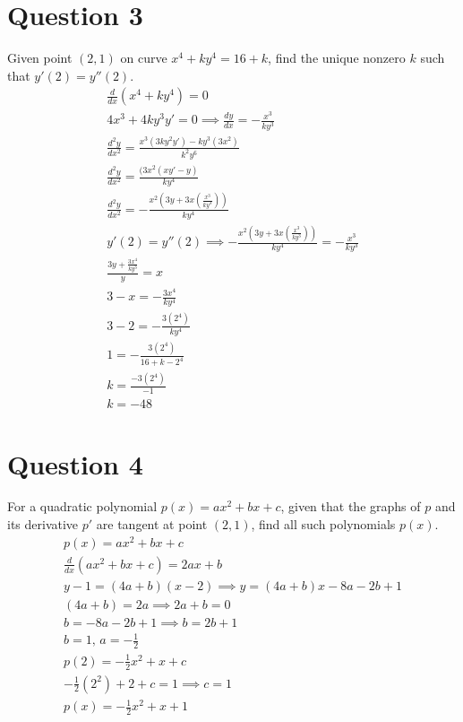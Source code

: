 \documentclass[12pt]{article}
\newcommand{\ddx}{\frac{d}{dx}}
\newcommand{\dydx}{\frac{dy}{dx}}
\begin{document}
\section{Question 3}
Given point $(2,1)$ on curve $x^4+ky^4=16+k$, find the unique nonzero $k$ such that $y'(2)=y''(2).$
\begin{gather*}
    \ddx (x^4+ky^4)=0\\
    4x^3+4ky^3y'=0 \implies \dydx=-\frac{x^3}{ky^3}\\
    \frac{d^2y}{dx^2}=\frac{x^3(3ky^2y')-ky^3(3x^2)}{k^2y^6}\\
    \frac{d^2y}{dx^2}=\frac{(3x^2(xy'-y)}{ky^4}\\
    \frac{d^2y}{dx^2}=-\frac{x^2(3y+3x(\frac{x^3}{ky^3}))}{ky^4}\\
    y'(2)=y''(2)\implies -\frac{x^2(3y+3x(\frac{x^3}{ky^3}))}{ky^4}=-\frac{x^3}{ky^3}\\
    \frac{3y+\frac{3x^4}{ky^3}}{y}=x\\
    3-x=-\frac{3x^4}{ky^4}\\
    3-2=-\frac{3(2^4)}{ky^4}\\
    1=-\frac{3(2^4)}{16+k-2^4}\\
    k=\frac{-3(2^4)}{-1}\\
    \boxed{k=-48}
\end{gather*}

\section{Question 4}
For a quadratic polynomial $p(x)=ax^2+bx+c$, given that the graphs of $p$ and its derivative $p'$ are tangent at point $(2,1)$, find all such polynomials $p(x)$.
\begin{gather*}
    p(x)=ax^2+bx+c\\
    \ddx(ax^2+bx+c)=2ax+b\\
    y-1=(4a+b)(x-2)\implies y=(4a+b)x-8a-2b+1\\
    (4a+b)=2a \implies 2a+b=0\\
    b=-8a-2b+1 \implies b=2b+1\\
    b=1,\, a=-\frac{1}{2}\\
    p(2)=-\frac{1}{2}x^2+x+c\\
    -\frac{1}{2}(2^2)+2+c=1\implies c=1\\
    \boxed{p(x)=-\frac{1}{2}x^2+x+1}
\end{gather*}
\end{document}
